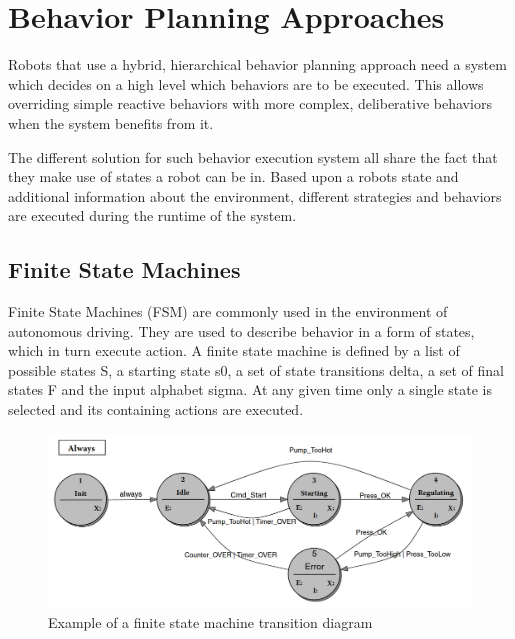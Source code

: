 \section{Behavior Planning Approaches}

Robots that use a hybrid, hierarchical behavior planning approach need a system which decides on a high level which behaviors are to be executed. This allows overriding simple reactive behaviors with more complex, deliberative behaviors when the system benefits from it. 

The different solution for such behavior execution system all share the fact that they make use of states a robot can be in. Based upon a robots state and additional information about the environment, different strategies and behaviors are executed during the runtime of the system. 
 

\subsection{Finite State Machines}

Finite State Machines (FSM) are commonly used in the environment of autonomous driving. They are used to describe behavior in a form of states, which in turn execute action. A finite state machine is defined by a list of possible states S, a starting state s0, a set of state transitions delta, a set of final states F and the input alphabet sigma. At any given time only a single state is selected and its containing actions are executed. 

\begin{figure}[ht]
	\label{fig:fsm}
	\includegraphics[width=1.0\textwidth]{images/fsm.png} 
	\caption{Example of a finite state machine transition diagram \cite{wagner2006} }
\end{figure}

